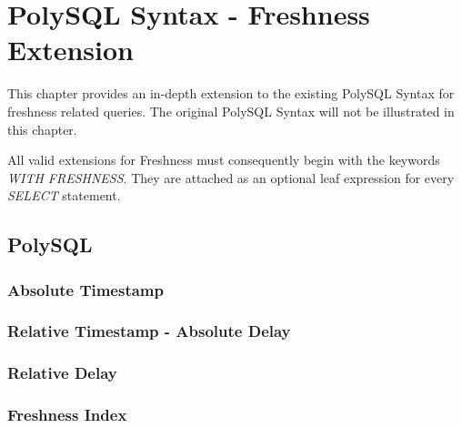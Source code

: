 \chapter{PolySQL Syntax - Freshness Extension}
This chapter provides an in-depth extension to the existing PolySQL Syntax for freshness related queries.
The original PolySQL Syntax will not be illustrated in this chapter.

All valid extensions for Freshness must consequently begin with the keywords \emph{WITH FRESHNESS}.
They are attached as an optional leaf expression for every \emph{SELECT} statement.

\tocless\section{PolySQL}

\tocless\subsection{Absolute Timestamp}

\tocless\subsection{Relative Timestamp - Absolute Delay}

\tocless\subsection{Relative Delay}

\tocless\subsection{Freshness Index} 